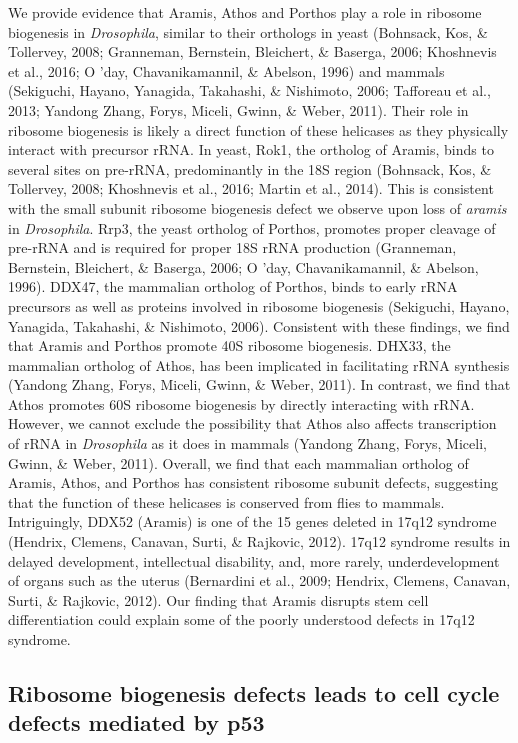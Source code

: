 \documentclass[12pt,oneside]{reedthesis}
\begin{document}
We provide evidence that Aramis, Athos and Porthos play a role in ribosome biogenesis in \emph{Drosophila}, similar to their orthologs in yeast (Bohnsack, Kos, \& Tollervey, 2008; Granneman, Bernstein, Bleichert, \& Baserga, 2006; Khoshnevis et al., 2016; O 'day, Chavanikamannil, \& Abelson, 1996) and mammals (Sekiguchi, Hayano, Yanagida, Takahashi, \& Nishimoto, 2006; Tafforeau et al., 2013; Yandong Zhang, Forys, Miceli, Gwinn, \& Weber, 2011). Their role in ribosome biogenesis is likely a direct function of these helicases as they physically interact with precursor rRNA. In yeast, Rok1, the ortholog of Aramis, binds to several sites on pre-rRNA, predominantly in the 18S region (Bohnsack, Kos, \& Tollervey, 2008; Khoshnevis et al., 2016; Martin et al., 2014). This is consistent with the small subunit ribosome biogenesis defect we observe upon loss of \emph{aramis} in \emph{Drosophila}. Rrp3, the yeast ortholog of Porthos, promotes proper cleavage of pre-rRNA and is required for proper 18S rRNA production (Granneman, Bernstein, Bleichert, \& Baserga, 2006; O 'day, Chavanikamannil, \& Abelson, 1996). DDX47, the mammalian ortholog of Porthos, binds to early rRNA precursors as well as proteins involved in ribosome biogenesis (Sekiguchi, Hayano, Yanagida, Takahashi, \& Nishimoto, 2006). Consistent with these findings, we find that Aramis and Porthos promote 40S ribosome biogenesis. DHX33, the mammalian ortholog of Athos, has been implicated in facilitating rRNA synthesis (Yandong Zhang, Forys, Miceli, Gwinn, \& Weber, 2011). In contrast, we find that Athos promotes 60S ribosome biogenesis by directly interacting with rRNA. However, we cannot exclude the possibility that Athos also affects transcription of rRNA in \emph{Drosophila} as it does in mammals (Yandong Zhang, Forys, Miceli, Gwinn, \& Weber, 2011). Overall, we find that each mammalian ortholog of Aramis, Athos, and Porthos has consistent ribosome subunit defects, suggesting that the function of these helicases is conserved from flies to mammals. Intriguingly, DDX52 (Aramis) is one of the 15 genes deleted in 17q12 syndrome (Hendrix, Clemens, Canavan, Surti, \& Rajkovic, 2012). 17q12 syndrome results in delayed development, intellectual disability, and, more rarely, underdevelopment of organs such as the uterus (Bernardini et al., 2009; Hendrix, Clemens, Canavan, Surti, \& Rajkovic, 2012). Our finding that Aramis disrupts stem cell differentiation could explain some of the poorly understood defects in 17q12 syndrome.

\hypertarget{ribosome-biogenesis-defects-leads-to-cell-cycle-defects-mediated-by-p53}{%
\subsection{Ribosome biogenesis defects leads to cell cycle defects mediated by p53}\label{ribosome-biogenesis-defects-leads-to-cell-cycle-defects-mediated-by-p53}}
\end{document}
